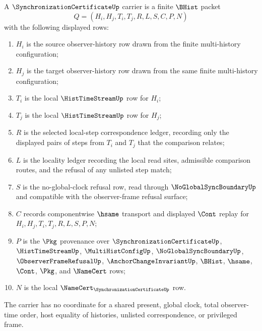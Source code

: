 \begin{definition}
\label{def:synchronization-certificate-carrier}
A $\SynchronizationCertificateUp$ carrier is a finite $\BHist$ packet
$$
Q=(H_i,H_j,T_i,T_j,R,L,S,C,P,N)
$$
with the following displayed rows:
\begin{enumerate}
\item $H_i$ is the source observer-history row drawn from the finite multi-history configuration;
\item $H_j$ is the target observer-history row drawn from the same finite multi-history configuration;
\item $T_i$ is the local $\HistTimeStreamUp$ row for $H_i$;
\item $T_j$ is the local $\HistTimeStreamUp$ row for $H_j$;
\item $R$ is the selected local-step correspondence ledger, recording only the displayed pairs of steps from $T_i$ and $T_j$ that the comparison relates;
\item $L$ is the locality ledger recording the local read sites, admissible comparison routes, and the refusal of any unlisted step match;
\item $S$ is the no-global-clock refusal row, read through $\NoGlobalSyncBoundaryUp$ and compatible with the observer-frame refusal surface;
\item $C$ records componentwise $\hsame$ transport and displayed $\Cont$ replay for $H_i,H_j,T_i,T_j,R,L,S,P,N$;
\item $P$ is the $\Pkg$ provenance over $\SynchronizationCertificateUp$, $\HistTimeStreamUp$, $\MultiHistConfigUp$, $\NoGlobalSyncBoundaryUp$, $\ObserverFrameRefusalUp$, $\AnchorChangeInvariantUp$, $\BHist$, $\hsame$, $\Cont$, $\Pkg$, and $\NameCert$ rows;
\item $N$ is the local $\NameCert_{\SynchronizationCertificateUp}$ row.
\end{enumerate}
The carrier has no coordinate for a shared present, global clock, total observer-time order, host equality of histories, unlisted correspondence, or privileged frame.
\end{definition}

